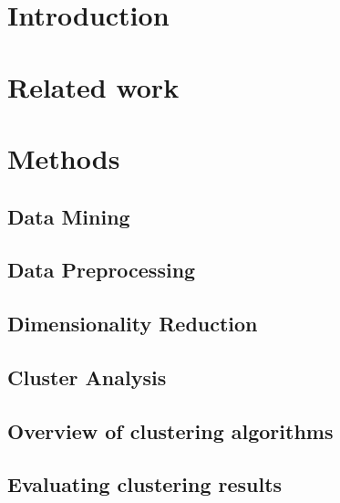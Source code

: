 \section{Introduction}
\label{section:Introduction}



\section{Related work}
\label{section:RelatedWork}



\section{Methods}
\label{section:Theory}

  \subsection{Data Mining}
  \label{section:TheoryDataMining}
  
    
  \subsection{Data Preprocessing}
  \label{section:TheoryDataPreprocessing}
  

  \subsection{Dimensionality Reduction}
  \label{section:TheoryDimensionalityReduction}
  
  
  \subsection{Cluster Analysis}
  \label{section:TheoryClusterAnalysis}
  

  \subsection{Overview of clustering algorithms}
  \label{section:TheoryOverviewClusteringAlgorithms}
  

  \subsection{Evaluating clustering results}
  \label{section:TheoryEvaluatingClusteringResults}
  


